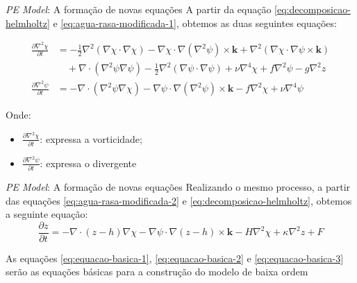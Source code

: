 \begin{frame}{\textit{PE Model}: A formação de novas equações}
   A partir da equação \eqref{eq:decomposicao-helmholtz} e \eqref{eq:agua-rasa-modificada-1}, obtemos as duas seguintes equações:
   \begin{small}
       \begin{align}
           \frac{\partial \nabla^2 \chi}{\partial t} &= -\frac{1}{2}\nabla^2(\nabla \chi \cdot \nabla \chi) - \nabla \chi \cdot \nabla(\nabla^2\psi) \times \mathbf{k} + \nabla^2(\nabla \chi \cdot \nabla \psi \times \mathbf{k}) \nonumber \\
           &\quad + \nabla \cdot (\nabla^2\psi\nabla\psi) - \frac{1}{2}\nabla^2(\nabla \psi \cdot \nabla \psi) + \nu\nabla^4\chi + f\nabla^2\psi - g\nabla^2z \label{eq:equacao-basica-1} \\
           \frac{\partial \nabla^2 \psi}{\partial t} &= -\nabla \cdot (\nabla^2\psi\nabla \chi) - \nabla \psi \cdot \nabla(\nabla^2\psi) \times \mathbf{k} - f\nabla^2\chi + \nu\nabla^4\psi\label{eq:equacao-basica-2}
       \end{align}
   \end{small}

   Onde:
   \begin{itemize}
       \item $\frac{\partial \nabla^2 \chi}{\partial t}$: expressa a vorticidade;
       \item $\frac{\partial \nabla^2 \psi}{\partial t}$: expressa o divergente
   \end{itemize}
\end{frame}


\begin{frame}{\textit{PE Model}: A formação de novas equações}
   Realizando o mesmo processo, a partir das equações \eqref{eq:agua-rasa-modificada-2} e \eqref{eq:decomposicao-helmholtz}, obtemos a seguinte equação:
    \begin{equation}
        \frac{\partial z}{\partial t} = -\nabla \cdot (z - h)\nabla \chi - \nabla \psi \cdot \nabla(z - h) \times \mathbf{k} - H\nabla^2\chi + \kappa\nabla^2z + F \label{eq:equacao-basica-3}
    \end{equation}

    As equações \eqref{eq:equacao-basica-1}, \eqref{eq:equacao-basica-2} e \eqref{eq:equacao-basica-3} serão as equações básicas para a construção do modelo de baixa ordem
\end{frame}

